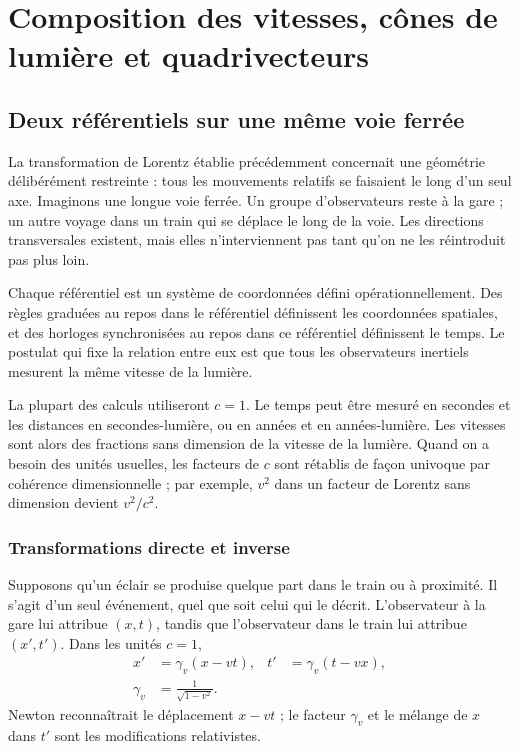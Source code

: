 \chapter{Composition des vitesses, cônes de lumière et quadrivecteurs}

\section{Deux référentiels sur une même voie ferrée}

La transformation de Lorentz établie précédemment concernait une géométrie délibérément restreinte : tous les mouvements relatifs se faisaient le long d’un seul axe. Imaginons une longue voie ferrée. Un groupe d’observateurs reste à la gare ; un autre voyage dans un train qui se déplace le long de la voie. Les directions transversales existent, mais elles n’interviennent pas tant qu’on ne les réintroduit pas plus loin.

Chaque référentiel est un système de coordonnées défini opérationnellement. Des règles graduées au repos dans le référentiel définissent les coordonnées spatiales, et des horloges synchronisées au repos dans ce référentiel définissent le temps. Le postulat qui fixe la relation entre eux est que tous les observateurs inertiels mesurent la même vitesse de la lumière.

La plupart des calculs utiliseront \(c=1\). Le temps peut être mesuré en secondes et les distances en secondes-lumière, ou en années et en années-lumière. Les vitesses sont alors des fractions sans dimension de la vitesse de la lumière. Quand on a besoin des unités usuelles, les facteurs de \(c\) sont rétablis de façon univoque par cohérence dimensionnelle ; par exemple, \(v^2\) dans un facteur de Lorentz sans dimension devient \(v^2/c^2\).

\subsection{Transformations directe et inverse}

Supposons qu’un éclair se produise quelque part dans le train ou à proximité. Il s’agit d’un seul événement, quel que soit celui qui le décrit. L’observateur à la gare lui attribue \((x,t)\), tandis que l’observateur dans le train lui attribue \((x',t')\). Dans les unités \(c=1\),
\begin{align}
x'&=\gamma_v(x-vt),&
t'&=\gamma_v(t-vx),
\label{eq:sr2-direct}\\
\gamma_v&=\frac{1}{\sqrt{1-v^2}}.
\end{align}
Newton reconnaîtrait le déplacement \(x-vt\) ; le facteur \(\gamma_v\) et le mélange de \(x\) dans \(t'\) sont les modifications relativistes.

